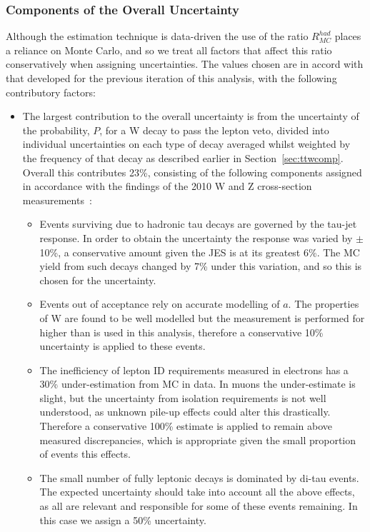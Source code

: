 \subsubsection{Components of the Overall Uncertainty}
Although the estimation technique is data-driven the use of the ratio $R^{had}_{MC}$ places a reliance on Monte Carlo, and so we treat all factors that affect this ratio conservatively when assigning uncertainties. The values chosen are in accord with that developed for the previous iteration of this analysis, with the following contributory factors:
\begin{itemize}
\item The largest contribution to the overall uncertainty is from the uncertainty of the probability, $P$, for a W decay to pass the lepton veto, divided into individual uncertainties on each type of decay averaged whilst weighted by the frequency of that decay as described earlier in Section~\ref{sec:ttwcomp}. Overall this contributes 23\%, consisting of the following components assigned in accordance with the findings of the 2010 W and Z cross-section measurements~\cite{WZXS}:
\begin{itemize}
\item Events surviving due to hadronic tau decays are governed by the tau-jet response. In order to obtain the uncertainty the response was varied by $\pm$ 10\%, a conservative amount given the JES is at its greatest 6\%. The MC yield from such decays changed by 7\% under this variation, and so this is chosen for the uncertainty. 
\item Events out of acceptance rely on accurate modelling of $a$. The properties of W are found to be well modelled but the measurement is performed for higher \Pt than is used in this analysis, therefore a conservative 10\% uncertainty is applied to these events. 
\item The inefficiency of lepton ID requirements measured in electrons has a 30\% under-estimation from MC in data. In muons the under-estimate is slight, but the uncertainty from isolation requirements is not well understood, as unknown pile-up effects could alter this drastically. Therefore a conservative 100\% estimate is applied to remain above measured discrepancies, which is appropriate given the small proportion of events this effects. 
\item The small number of fully leptonic \tto decays is dominated by di-tau events. The expected uncertainty should take into account all the above effects, as all are relevant and responsible for some of these events remaining. In this case we assign a 50\% uncertainty.

\end{itemize}
\end{itemize}
